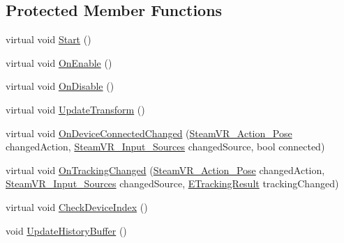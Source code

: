 \subsection*{Protected Member Functions}
\begin{DoxyCompactItemize}
\item 
virtual void \mbox{\hyperlink{class_valve_1_1_v_r_1_1_steam_v_r___behaviour___pose_a8a71e7617dd2132c4ef9c1ffcad1697b}{Start}} ()
\item 
virtual void \mbox{\hyperlink{class_valve_1_1_v_r_1_1_steam_v_r___behaviour___pose_acab997c4e82da2873b6462214a4ca96f}{On\+Enable}} ()
\item 
virtual void \mbox{\hyperlink{class_valve_1_1_v_r_1_1_steam_v_r___behaviour___pose_afa7656935133f0cc8a07ddcba75eef42}{On\+Disable}} ()
\item 
virtual void \mbox{\hyperlink{class_valve_1_1_v_r_1_1_steam_v_r___behaviour___pose_ac02430d88b500c93031ed5b21b2783fe}{Update\+Transform}} ()
\item 
virtual void \mbox{\hyperlink{class_valve_1_1_v_r_1_1_steam_v_r___behaviour___pose_a482f66677a5fba6e3f4f78540ea1c449}{On\+Device\+Connected\+Changed}} (\mbox{\hyperlink{class_valve_1_1_v_r_1_1_steam_v_r___action___pose}{Steam\+V\+R\+\_\+\+Action\+\_\+\+Pose}} changed\+Action, \mbox{\hyperlink{namespace_valve_1_1_v_r_a82e5bf501cc3aa155444ee3f0662853f}{Steam\+V\+R\+\_\+\+Input\+\_\+\+Sources}} changed\+Source, bool connected)
\item 
virtual void \mbox{\hyperlink{class_valve_1_1_v_r_1_1_steam_v_r___behaviour___pose_a5f7af5e04519b2f061b96aaba64035b4}{On\+Tracking\+Changed}} (\mbox{\hyperlink{class_valve_1_1_v_r_1_1_steam_v_r___action___pose}{Steam\+V\+R\+\_\+\+Action\+\_\+\+Pose}} changed\+Action, \mbox{\hyperlink{namespace_valve_1_1_v_r_a82e5bf501cc3aa155444ee3f0662853f}{Steam\+V\+R\+\_\+\+Input\+\_\+\+Sources}} changed\+Source, \mbox{\hyperlink{namespace_valve_1_1_v_r_abe6feab98f33191b7c27b4292012e90a}{E\+Tracking\+Result}} tracking\+Changed)
\item 
virtual void \mbox{\hyperlink{class_valve_1_1_v_r_1_1_steam_v_r___behaviour___pose_aec903264cd15509cc38de0fc70629472}{Check\+Device\+Index}} ()
\item 
void \mbox{\hyperlink{class_valve_1_1_v_r_1_1_steam_v_r___behaviour___pose_a1e7d5dd9ecc5dedfd163fc0bdc95684d}{Update\+History\+Buffer}} ()
\end{DoxyCompactItemize}
